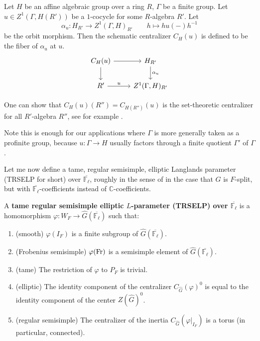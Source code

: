 	\begin{definition}
	Let $H$ be an affine algebraic group over a ring $R$, $\Gamma$ be a finite group. Let $u \in Z^1(\Gamma, H(R'))$ be a $1$-cocycle for some $R$-algebra $R'$. Let 
	$$\alpha_u: H_{R'} \longrightarrow Z^1(\Gamma, H)_{R'}\qquad h \longmapsto hu(-)h^{-1}$$
	 be the orbit morphism. Then the schematic centralizer $C_H(u)$ is defined to be the fiber of $\alpha_u$ at $u$.
	$$	
	\begin{tikzcd}
		{C_H(u)} \arrow[r, ""] \arrow[d, ""] & {H_{R'}} \arrow[d, "{\alpha_u}"] \\
		{R'} \arrow[r, "u"]                & {Z^1(\Gamma, H)_{R'}}               
	\end{tikzcd}
	$$	
	\end{definition}
	
	One can show that $C_H(u)(R'')=C_{H(R'')}(u)$ is the set-theoretic centralizer for all $R'$-algebra $R''$, see for example \cite[Appendix A]{dhkm2020moduli}.
	
	\begin{remark}
			Note this is enough for our applications where $\Gamma$ is more generally taken as a profinite group, because $u: \Gamma \to H$ usually factors through a finite quotient $\Gamma'$ of $\Gamma$.
	\end{remark}
	
	Let me now define a tame, regular semisimple, elliptic Langlands parameter (TRSELP for short) over $\overline{\mathbb{F}_{\ell}}$, roughly in the sense of \cite[Section 3.4 and Section 4.1]{debacker2009depth} in the case that $G$ is $F$-split, but with $\overline{\mathbb{F}_{\ell}}$-coefficients instead of $\mathbb{C}$-coefficients.
	
	\begin{definition}\label{Def TRSELP}
		A \textbf{tame regular semisimple elliptic $L$-parameter (TRSELP) over $\overline{\mathbb{F}_{\ell}}$} is a homomorphism $\varphi: W_F \to \hat{G}(\overline{\mathbb{F}_{\ell}})$ such that:
		\begin{enumerate}
			\item (smooth) $\varphi(I_F)$ is a finite subgroup of $\hat{G}(\overline{\mathbb{F}_{\ell}})$.
			\item (Frobenius semisimple) $\varphi(\operatorname{Fr})$ is a semisimple element of $\hat{G}(\overline{\mathbb{F}_{\ell}})$.
			\item (tame) The restriction of $\varphi$ to $P_F$ is trivial.
			\item \label{elliptic} (elliptic) The identity component of the centralizer $C_{\hat{G}}(\varphi)^0$ is equal to the identity component of the center $Z(\hat{G})^0$.
			\item \label{regular semisimple}(regular semisimple) The centralizer of the inertia $C_{\hat{G}}(\varphi|_{I_F})$ is a torus (in particular, connected).
		\end{enumerate}
	\end{definition}

